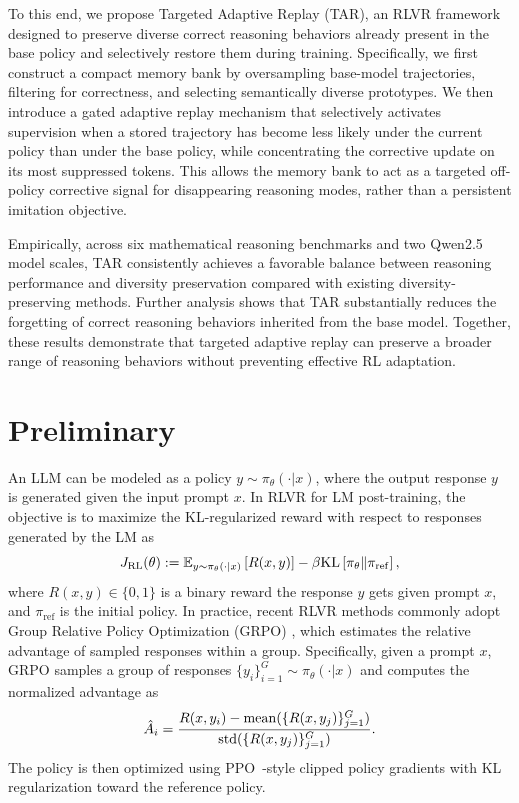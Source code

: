 \documentclass[11pt]{article}
\newcommand{\model}{\textsc{TAR}\xspace}
\begin{document}
To this end, we propose Targeted Adaptive Replay (\model), an RLVR framework designed to preserve diverse correct reasoning behaviors already present in the base policy and selectively restore them during training.
Specifically, we first construct a compact memory bank by oversampling base-model trajectories, filtering for correctness, and selecting semantically diverse prototypes.
We then introduce a gated adaptive replay mechanism that selectively activates supervision when a stored trajectory has become less likely under the current policy than under the base policy, while concentrating the corrective update on its most suppressed tokens.
This allows the memory bank to act as a targeted off-policy corrective signal for disappearing reasoning modes, rather than a persistent imitation objective.

Empirically, across six mathematical reasoning benchmarks and two Qwen2.5 model scales, \model consistently achieves a favorable balance between reasoning performance and diversity preservation compared with existing diversity-preserving methods. Further analysis shows that \model substantially reduces the forgetting of correct reasoning behaviors inherited from the base model. Together, these results demonstrate that targeted adaptive replay can preserve a broader range of reasoning behaviors without preventing effective RL adaptation.


\section{Preliminary}

An LLM can be modeled as a policy $y\sim\pi_{\theta}(\cdot|x)$, where the output response $y$ is generated given the input prompt $x$. In RLVR for LM post-training, the objective is to maximize the KL-regularized reward with respect to responses generated by the LM as 
\begin{equation}\label{eq:rlobj}\small
    J_{\text{RL}}(\theta) := \mathbb{E}_{y \sim \pi_\theta(\cdot \mid x)}\left[R(x, y)\right] - \beta \mathrm{KL}\left[\pi_\theta \| \pi_{\mathrm{ref}}\right],
\end{equation}
where $R(x, y) \in \{0, 1\}$ is a binary reward the response $y$ gets given prompt $x$, and $\pi_{\mathrm{ref}}$ is the initial policy.
In practice, recent RLVR methods commonly adopt Group Relative Policy Optimization (GRPO) \cite{shao2024deepseekmath}, which estimates the relative advantage of sampled responses within a group. Specifically, given a prompt $x$, GRPO samples a group of responses $\{y_i\}_{i=1}^G \sim \pi_\theta(\cdot|x)$ and computes the normalized advantage as
\begin{equation}\small
    \hat{A}_i = \frac{R(x,y_i)-\mathrm{mean}(\{R(x,y_j)\}_{j=1}^G)}
    {\mathrm{std}(\{R(x,y_j)\}_{j=1}^G)}.
\end{equation}
The policy is then optimized using PPO~\cite{ppo}-style clipped policy gradients with KL regularization toward the reference policy. 
\end{document}
